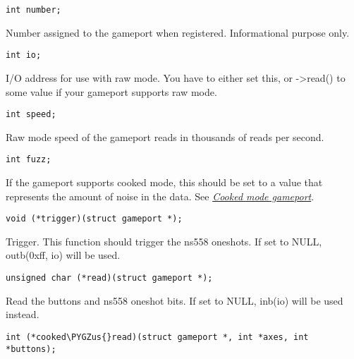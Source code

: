 \documentclass[a4paper,8pt,english]{sphinxmanual}
\def\PYGZus{\char`\_}
\begin{document}
\begin{Verbatim}[commandchars=\\\{\}]
int number;
\end{Verbatim}

Number assigned to the gameport when registered. Informational purpose only.

\begin{Verbatim}[commandchars=\\\{\}]
int io;
\end{Verbatim}

I/O address for use with raw mode. You have to either set this, or -\textgreater{}read()
to some value if your gameport supports raw mode.

\begin{Verbatim}[commandchars=\\\{\}]
int speed;
\end{Verbatim}

Raw mode speed of the gameport reads in thousands of reads per second.

\begin{Verbatim}[commandchars=\\\{\}]
int fuzz;
\end{Verbatim}

If the gameport supports cooked mode, this should be set to a value that
represents the amount of noise in the data. See
{\hyperref[input/gameport\string-programming:gameport\string-pgm\string-cooked\string-mode]{\emph{Cooked mode gameport}}}.

\begin{Verbatim}[commandchars=\\\{\}]
void (*trigger)(struct gameport *);
\end{Verbatim}

Trigger. This function should trigger the ns558 oneshots. If set to NULL,
outb(0xff, io) will be used.

\begin{Verbatim}[commandchars=\\\{\}]
unsigned char (*read)(struct gameport *);
\end{Verbatim}

Read the buttons and ns558 oneshot bits. If set to NULL, inb(io) will be
used instead.

\begin{Verbatim}[commandchars=\\\{\}]
int (*cooked\PYGZus{}read)(struct gameport *, int *axes, int *buttons);
\end{Verbatim}
\end{document}
